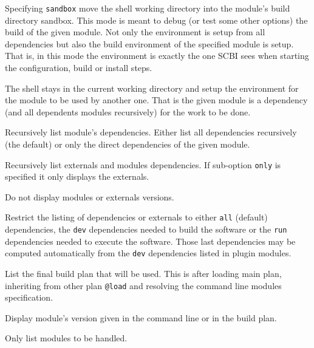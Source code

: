 \documentclass[a4paper,12pt,twoside]{article}
\newcommand{\code}[1]{\texttt{#1}}
\newcommand{\ddash}{-{}-}
\begin{document}
\begin{description}[font=\texttt]
	\begin{description}[font=\texttt]
		\item[sandbox] Specifying \code{sandbox} move the shell working directory into the module's build directory sandbox. This mode is meant to debug (or test some other options) the build of the given module. Not only the environment is setup from all dependencies but also the build environment of the specified module is setup. That is, in this mode the environment is exactly the one SCBI sees when starting the configuration, build or install steps.

		\item[no sub-option] The shell stays in the current working directory and setup the environment for the module to be used by another one. That is the given module is a dependency (and all dependents modules recursively) for the work to be done.
	\end{description}

	\item[\ddash{}list-depends:{[}direct|full{]}] Recursively list module's dependencies. Either list all dependencies recursively (the default) or only the direct dependencies of the given module.

	\item[\ddash{}list-externals:{[}only{]}] Recursively list externals and modules dependencies. If sub-option \code{only} is specified it only displays the externals.

	\item[\ddash{}list-no-version] Do not display modules or externals versions.

	\item[\ddash{}list-filter:{[}all|run|dev{]} ] Restrict the listing of dependencies or externals to either \code{all} (default) dependencies, the \code{dev} dependencies needed to build the software or the \code{run} dependencies needed to execute the software. Those last dependencies may be computed automatically from the \code{dev} dependencies listed in plugin modules.

	\item[\ddash{}list-plan] List the final build plan that will be used. This is after loading main plan, inheriting from other plan \code{@load} and resolving the command line modules specification.

	\item[\ddash{}module-version] Display module's version given in the command line or in the build plan.

	\item[\ddash{}dry-run] Only list modules to be handled.


\end{description}
\end{document}
